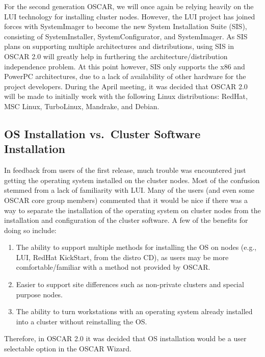 For the second generation OSCAR, we will once again be relying heavily
on the LUI technology for installing cluster nodes.  However, the LUI
project has joined forces with SystemImager to become the new System
Installation Suite (SIS), consisting of SystemInstaller,
SystemConfigurator, and SystemImager. As SIS plans on supporting
multiple architectures and distributions, using SIS in OSCAR 2.0 will
greatly help in furthering the architecture/distribution independence
problem. At this point however, SIS only supports the x86 and PowerPC
architectures, due to a lack of availability of other hardware for the
project developers. During the April meeting, it was decided that
OSCAR 2.0 will be made to initially work with the following Linux
distributions: RedHat, MSC Linux, TurboLinux, Mandrake, and Debian.

\subsection{OS Installation vs.\ Cluster Software Installation}

In  feedback  from  users  of  the first  release,  much  trouble  was
encountered just getting the operating system installed on the cluster
nodes. Most of  the confusion stemmed from a  lack of familiarity with
LUI.  Many of  the  users (and  even  some OSCAR  core group  members)
commented that  it would be  nice if there  was a way to  separate the
installation  of  the  operating  system  on cluster  nodes  from  the
installation and configuration  of the cluster software. A  few of the
benefits for doing so include:

\begin{enumerate}
\item The ability to support multiple methods for installing the OS on
nodes (e.g., LUI, RedHat KickStart, from the distro CD), as users may
be more comfortable/familiar with a method not provided by OSCAR.

\item Easier to support site differences such as non-private clusters
and special purpose nodes.

\item The ability to turn workstations with an operating system
already installed into a cluster without reinstalling the OS.
\end{enumerate}

Therefore, in OSCAR 2.0 it was decided that OS installation would be a
user selectable option in the OSCAR Wizard.

